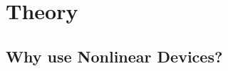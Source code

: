 \documentclass[journal]{IEEEtran} \usepackage[english]{babel}
\begin{document}






%



\section{ Theory }
\subsection{Why use Nonlinear Devices?}
\end{document}
